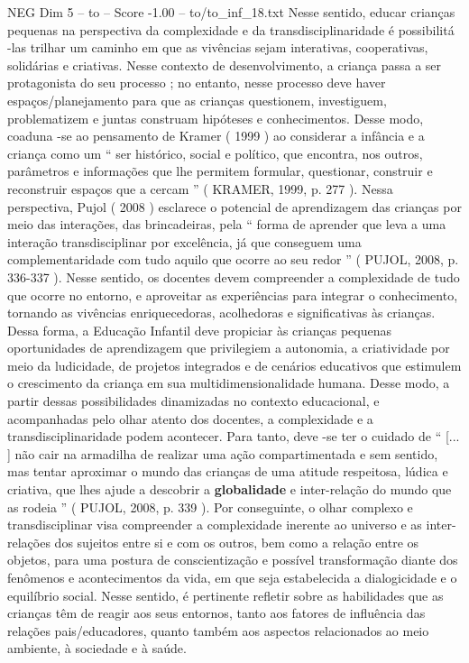 \begin{textsample}{NEG Dim 5 – to – Score -1.00 – to/to\_inf\_18.txt}
Nesse sentido, educar crianças pequenas na perspectiva da complexidade e da transdisciplinaridade é possibilitá -las trilhar um caminho em que as vivências sejam interativas, cooperativas, solidárias e criativas.
Nesse contexto de desenvolvimento, a criança passa a ser protagonista do seu processo ; no entanto, nesse processo deve haver espaços/planejamento para que as crianças questionem, investiguem, problematizem e juntas construam hipóteses e conhecimentos.
Desse modo, coaduna -se ao pensamento de Kramer ( 1999 ) ao considerar a infância e a criança como um “ ser histórico, social e político, que encontra, nos outros, parâmetros e informações que lhe permitem formular, questionar, construir e reconstruir espaços que a cercam ” ( KRAMER, 1999, p. 277 ).
Nessa perspectiva, Pujol ( 2008 ) esclarece o potencial de aprendizagem das crianças por meio das interações, das brincadeiras, pela “ forma de aprender que leva a uma interação transdisciplinar por excelência, já que conseguem uma complementaridade com tudo aquilo que ocorre ao seu redor ” ( PUJOL, 2008, p. 336-337 ).
Nesse sentido, os docentes devem compreender a complexidade de tudo que ocorre no entorno, e aproveitar as experiências para integrar o conhecimento, tornando as vivências enriquecedoras, acolhedoras e significativas às crianças.
Dessa forma, a Educação Infantil deve propiciar às crianças pequenas oportunidades de aprendizagem que privilegiem a autonomia, a criatividade por meio da ludicidade, de projetos integrados e de cenários educativos que estimulem o crescimento da criança em sua multidimensionalidade humana.
Desse modo, a partir dessas possibilidades dinamizadas no contexto educacional, e acompanhadas pelo olhar atento dos docentes, a complexidade e a transdisciplinaridade podem acontecer.
Para tanto, deve -se ter o cuidado de “ [... ] não cair na armadilha de realizar uma ação compartimentada e sem sentido, mas tentar aproximar o mundo das crianças de uma atitude respeitosa, lúdica e criativa, que lhes ajude a descobrir a \textbf{globalidade} e inter-relação do mundo que as rodeia ” ( PUJOL, 2008, p. 339 ).
Por conseguinte, o olhar complexo e transdisciplinar visa compreender a complexidade inerente ao universo e as inter-relações dos sujeitos entre si e com os outros, bem como a relação entre os objetos, para uma postura de conscientização e possível transformação diante dos fenômenos e acontecimentos da vida, em que seja estabelecida a dialogicidade e o equilíbrio social.
Nesse sentido, é pertinente refletir sobre as habilidades que as crianças têm de reagir aos seus entornos, tanto aos fatores de influência das relações pais/educadores, quanto também aos aspectos relacionados ao meio ambiente, à sociedade e à saúde.

\end{textsample}
